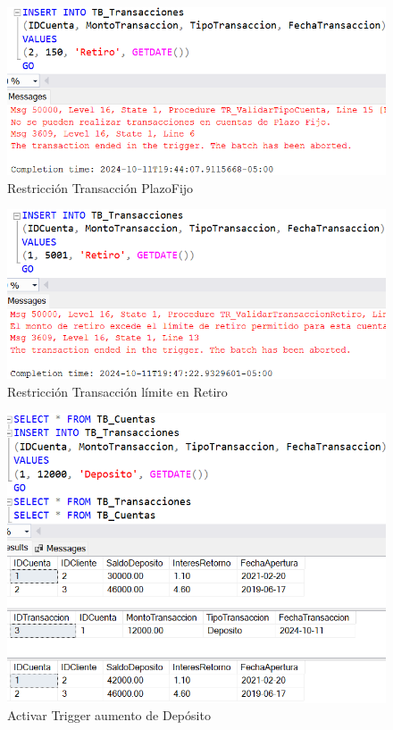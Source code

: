 \begin{figure}[H]
  \centering
  \includegraphics[scale = 0.5]{Imagenes/SQL/5.Ejercicios/restriccion_transaccion_plazofijo.png}
  \caption{Restricción Transacción PlazoFijo}
\end{figure}

\begin{figure}[H]
  \centering
  \includegraphics[scale = 0.5]{Imagenes/SQL/5.Ejercicios/restriccion_transaccion_limiteahorro.png}
  \caption{Restricción Transacción límite en Retiro}
\end{figure}

\begin{figure}[H]
  \centering
  \includegraphics[scale = 0.5]{Imagenes/SQL/5.Ejercicios/activar_trigger_aumentodeposito.png}
  \caption{Activar Trigger aumento de Depósito}
\end{figure}

